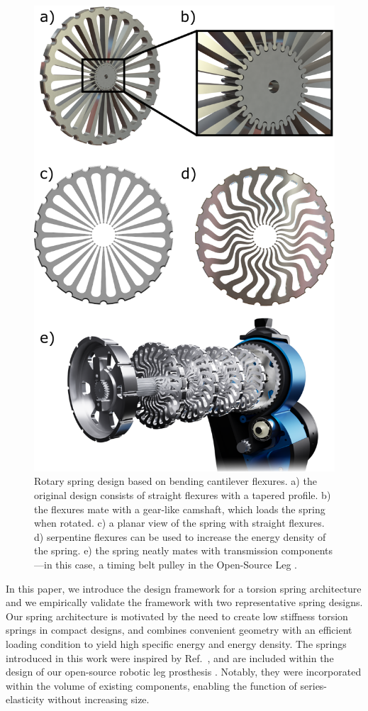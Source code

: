 \documentclass[letterpaper, 10 pt, conference]{ieeeconf} %
\begin{document}
\begin{figure}[h!]
    \centering
    \includegraphics[width=\columnwidth]{figs/spring_collage_icra3.png}
    \caption{Rotary spring design based on bending cantilever flexures. a) the original design consists of straight flexures with a tapered profile. b) the flexures mate with a gear-like camshaft, which loads the spring when rotated. c) a planar view of the spring with straight flexures. d) serpentine flexures can be used to increase the energy density of the spring. e) the spring neatly mates with transmission components---in this case, a timing belt pulley in the Open-Source Leg \cite{AzocarRouse2020}.}
    \label{fig:main_design}
\end{figure}
In this paper, we introduce the design framework for a torsion spring architecture and we empirically validate the framework with two representative spring designs. Our spring architecture is motivated by the need to create low stiffness torsion springs in compact designs, and combines convenient geometry with an efficient loading condition to yield high specific energy and energy density. The springs introduced in this work were inspired by Ref.~\cite{MooneyPaschDoan2017Patent}, and are included within the design of our open-source robotic leg prosthesis \cite{AzocarRouse2020}. Notably, they were incorporated within the volume of existing components, enabling the function of series-elasticity without increasing size.
\end{document}
